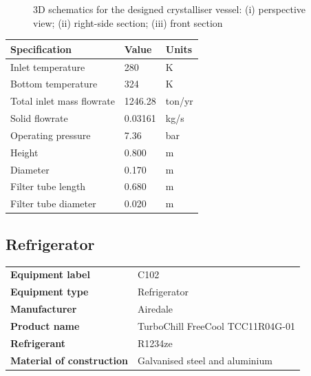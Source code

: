 \begin{figure}[H]
    \centering
    
    \caption{3D schematics for the designed crystalliser vessel: (i) perspective view; (ii) right-side section; (iii) front section}
    \label{fig:schematic wash column process design data sheet}
\end{figure}

\begin{table}[H]
\centering
\begin{tabular}{@{}l|l|l@{}}
\toprule
\textbf{Specification}                  & \textbf{Value}  & \textbf{Units}    \\ \midrule
Inlet temperature                       & 280             & K                \\ \midrule
Bottom temperature                      & 324             & K                \\ \midrule
Total inlet mass flowrate               & 1246.28         & ton/yr             \\ \midrule
Solid flowrate                          & 0.03161         & kg/s             \\ \midrule
Operating pressure                      & 7.36               & bar               \\ \midrule
Height                                  & 0.800           & m                 \\ \midrule
Diameter                                & 0.170           & m                 \\ \midrule
Filter tube length                      &  0.680          & m                 \\ \midrule
Filter tube diameter                    &  0.020          & m                  \\ \bottomrule
\end{tabular}
\end{table}
\newpage
\subsection{Refrigerator}

\begin{table}[H]
    \centering
    \begin{tabular}{@{}l|l@{}}
    \toprule
      \textbf{Equipment label}  & C102\\
       \textbf{Equipment type}  & Refrigerator \\
    \textbf{Manufacturer}  & Airedale \\
     \textbf{Product name}  & TurboChill FreeCool TCC11R04G-01 \\
          \textbf{Refrigerant}  & R1234ze \\
       \textbf{Material of construction} & Galvanised steel and aluminium \\
       \bottomrule
    \end{tabular}
\end{table}


